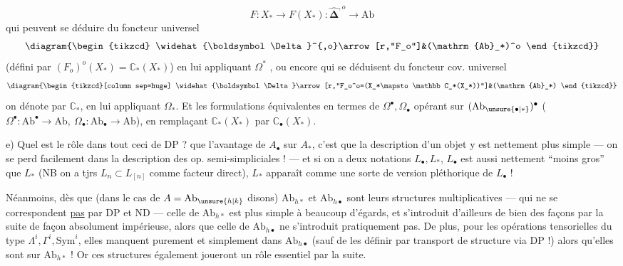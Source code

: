 \[
F:X_*\longrightarrow F(X_*):\widehat{\boldsymbol\Delta}^{,o}\longrightarrow\mathrm{Ab}
\]
qui peuvent se déduire du foncteur universel
\[
\diagram{\begin{tikzcd}
\widehat{\boldsymbol\Delta}^{,o}\arrow[r,"F_o"]&(\mathrm{Ab}_*)^o
\end{tikzcd}}
\]
(défini par $(F_o)^o(X_*)=\mathbb C_*(X_*)$) en lui appliquant  $\Omega^*$ , ou encore qui se déduisent du foncteur cov. universel
\[
\diagram{\begin{tikzcd}[column sep=huge]
\widehat{\boldsymbol\Delta}\arrow[r,"F_o^o=(X_*\mapsto\mathbb C_*(X_*))"]&(\mathrm{Ab}_*)
\end{tikzcd}}
\]
 on dénote par $\mathbb C_*$, en lui appliquant  $\Omega_*$. Et les  formulations équivalentes en termes de $\Omega^\bullet,\Omega_\bullet$ opérant sur $(\mathrm{Ab}_{\unsure{\bullet|*}})^\bullet$ ($\Omega^\bullet:\mathrm{Ab}^\bullet\longrightarrow\mathrm{Ab},\ \Omega_\bullet:\mathrm{Ab}_\bullet\longrightarrow\mathrm{Ab}$), en remplaçant $\mathbb C_*(X_*)$ par $\mathbb C_\bullet(X_*)$.

e) Quel est le rôle dans tout ceci de $\mathrm{DP}$ ?  que l’avantage de $A_\bullet$ sur $A_*$, c’est que la description d’un objet y est nettement plus simple --- on se perd facilement dans la description des op. semi-simpliciales ! --- et si on a deux notations $L_\bullet,L_*$, $L_\bullet$ est aussi nettement ``moins gros'' que $L_*$ (NB on a tjrs $L_n\subset L_{[n]}$ comme facteur direct), $L_*$ apparaît comme une sorte de version pléthorique de $L_\bullet$ !

Néanmoins, dès que (dans le cas de $A=\mathrm{Ab}_{\unsure{h|k}}$ disons) $\mathrm{Ab}_{h*}$ et $\mathrm{Ab}_{h\bullet}$ sont  leurs structures multiplicatives --- qui ne se correspondent \uline{pas} par DP et ND --- celle de $\mathrm{Ab}_{h*}$ est plus simple à beaucoup d’égards, et s’introduit d’ailleurs de bien des façons par la suite de façon absolument impérieuse, alors que celle de $\mathrm{Ab}_{h\bullet}$ ne s’introduit pratiquement pas.
De plus, pour les opérations tensorielles du type $\Lambda^i,\Gamma^i,\mathrm{Sym}^i$, elles manquent purement et simplement dans $\mathrm{Ab}_{h\bullet}$ (sauf de les définir par transport de structure via DP !) alors qu’elles sont   sur $\mathrm{Ab}_{h*}$ ! Or ces structures également joueront un rôle essentiel par la suite.
